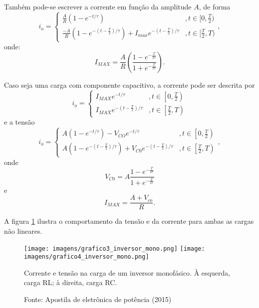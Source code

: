Também pode-se escrever a corrente em função da amplitude $A$, de forma \[
i_o = \begin{cases}
    \frac{A}{R}(1-e^{-t/\tau}) &, t \in [0,\frac{T}{2}) \\
    \frac{-A}{R}(1-e^{-(t-\frac{T}{2})/\tau}) + I_{max}e^{-(t-\frac{T}{2})/\tau} &, t \in [\frac{T}{2},T)
\end{cases}
,\] onde: \[
    I_{MAX} = \frac{A}{R} \left(  \frac{1-e^{-\frac{T}{2\tau}}}{1+e^{-\frac{T}{2\tau}}}\right) 
.\]

Caso seja uma carga com componente capacitivo, a corrente pode ser descrita por \[
i_o = \begin{cases}
    I_{MAX}e^{-t/\tau} &, t \in \left[0,\frac{T}{2}\right) \\
    I_{MAX}e^{-(t-\frac{T}{2})/\tau} &, t \in \left[\frac{T}{2}, T\right)
\end{cases}
\] e a tensão \[
i_o = \begin{cases}
    A(1-e^{-t/\tau}) - V_{CO}e^{-t/\tau} &, t \in \left[0,\frac{T}{2}\right) \\
    A(1-e^{-(t-\frac{T}{2})/\tau}) + V_{C0}e^{-(t-\frac{T}{2})/\tau} &, t \in \left[\frac{T}{2}, T\right)
\end{cases}
,\] onde \[
    V_{C0} = A\frac{1-e^{-\frac{T}{2\tau}}}{1+e^{-\frac{T}{2\tau}}}
\] e \[
    I_{MAX} = \frac{A + V_{co}}{R}
.\]

A figura \ref{g3im} ilustra o comportamento da tensão e da corrente para ambas as cargas não lineares.

\begin{figure}[h]
\center
\texttt{[image: imagens/grafico3\_inversor\_mono.png]}
\texttt{[image: imagens/grafico4\_inversor\_mono.png]}
\caption{Corrente e tensão na carga de um inversor monofásico. À esquerda, carga RL; à direita, carga RC.}\label{g3im} 
\caption*{Fonte: Apostila de eletrônica de potência (2015)}
\end{figure}

